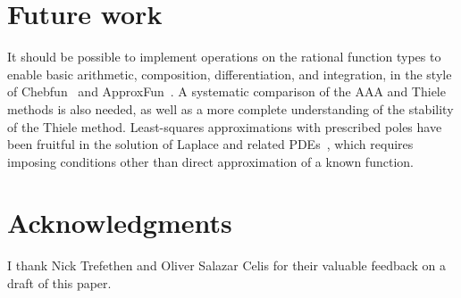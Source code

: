 \documentclass{juliacon}
\begin{document}
\section{Future work}

It should be possible to implement operations on the rational function types to enable basic arithmetic, composition, differentiation, and integration, in the style of Chebfun~\cite{driscollChebfunGuide2014a} and \textsf{ApproxFun}~\cite{olverPracticalFramework2014}. A systematic comparison of the AAA and Thiele methods is also needed, as well as a more complete understanding of the stability of the Thiele method. Least-squares approximations with prescribed poles have been fruitful in the solution of Laplace and related PDEs~\cite{costaAAAleastSquares2023,gopalSolvingLaplace2019,gopalRepresentationConformal2019}, which requires imposing conditions other than direct approximation of a known function.

\section{Acknowledgments}
I thank Nick Trefethen and Oliver Salazar Celis for their valuable feedback on a draft of this paper.


\end{document}
